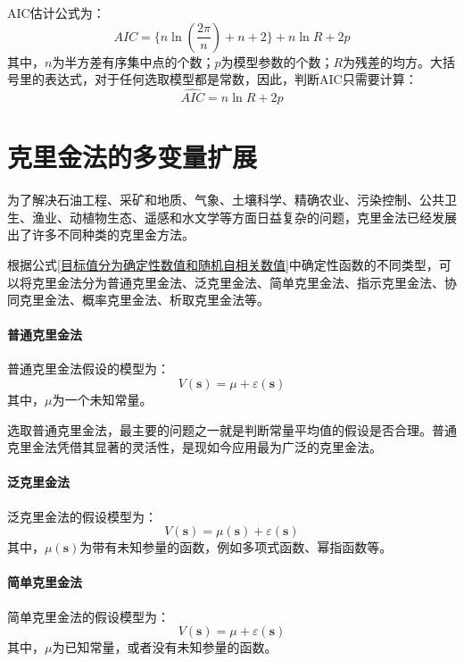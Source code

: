 AIC估计公式为：
\begin{equation}
    AIC = \{ n \ln \left( \frac{2 \pi}{n} \right) + n + 2 \} + n \ln R + 2 p
\end{equation}
其中，$ n $为半方差有序集中点的个数；$ p $为模型参数的个数；$ R $为残差的均方。大括号里的表达式，对于任何选取模型都是常数，因此，判断AIC只需要计算：
\begin{equation}
    \hat{AIC} = n \ln R + 2 p
\end{equation}

\section{克里金法的多变量扩展}
为了解决石油工程、采矿和地质、气象、土壤科学、精确农业、污染控制、公共卫生、渔业、动植物生态、遥感和水文学等方面日益复杂的问题，克里金法已经发展出了许多不同种类的克里金方法。

根据公式\ref{目标值分为确定性数值和随机自相关数值}中确定性函数的不同类型，可以将克里金法分为普通克里金法、泛克里金法、简单克里金法、指示克里金法、协同克里金法、概率克里金法、析取克里金法等。
\paragraph{普通克里金法}
普通克里金法假设的模型为：
\begin{equation}
    V\left( \mathbf{s} \right) = \mu + \varepsilon \left( \mathbf{s} \right)
\end{equation}
其中，$ \mu $为一个未知常量。

选取普通克里金法，最主要的问题之一就是判断常量平均值的假设是否合理。普通克里金法凭借其显著的灵活性，是现如今应用最为广泛的克里金法。
\paragraph{泛克里金法}
泛克里金法的假设模型为：
\begin{equation}
    V\left( \mathbf{s} \right) = \mu\left( \mathbf{s} \right) + \varepsilon\left( \mathbf{s} \right)
\end{equation}
其中，$ \mu\left( \mathbf{s} \right) $为带有未知参量的函数，例如多项式函数、幂指函数等。
\paragraph{简单克里金法}
简单克里金法的假设模型为：
\begin{equation}
    V\left( \mathbf{s} \right) = \mu + \varepsilon\left( \mathbf{s} \right)
\end{equation}
其中，$ \mu $为已知常量，或者没有未知参量的函数。
